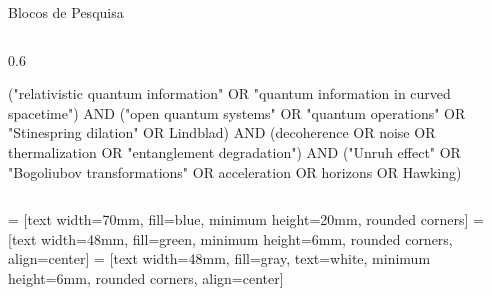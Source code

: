 \documentclass[aspectratio=169,usenames,dvipsnames,compress]{beamer}
\begin{document}

\begin{frame}{Blocos de Pesquisa}

\begin{columns}
\begin{column}{0.6\textwidth}


\begin{tcolorbox}[fit to height=3cm, title= String composta recomendada] 

("relativistic quantum information" OR "quantum information in curved spacetime")
AND
("open quantum systems" OR "quantum operations" OR "Stinespring dilation" OR Lindblad)
AND
(decoherence OR noise OR thermalization OR "entanglement degradation")
AND
("Unruh effect" OR "Bogoliubov transformations" OR acceleration OR horizons OR Hawking)
\end{tcolorbox}
\end{column}
\end{columns}
\end{frame}


\begin{frame}{}

 = [text width=70mm, fill=blue,  minimum height=20mm, rounded corners]
 = [text width=48mm, fill=green, minimum height=6mm, rounded corners, align=center] 
 = [text width=48mm, fill=gray, text=white, minimum height=6mm, rounded corners, align=center] 
\end{frame}
\end{document}
